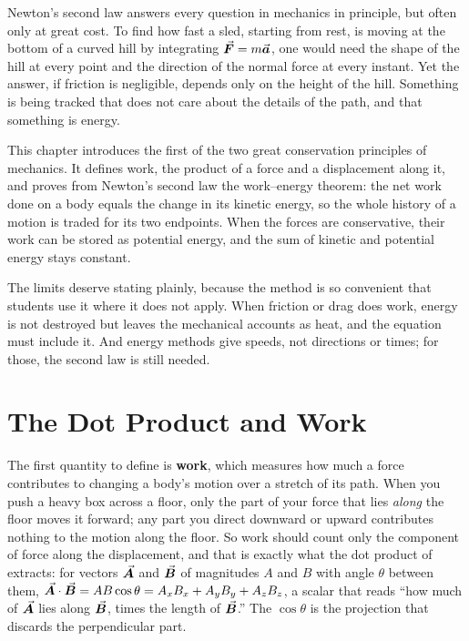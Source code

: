 

Newton's second law answers every question in mechanics in principle, but often only at great cost. To
find how fast a sled, starting from rest, is moving at the bottom of a curved hill by integrating $\vec{\bm{F}}=m\vec{\bm{a}}$, one would need the
shape of the hill at every point and the direction of the normal force at every instant. Yet the answer, if
friction is negligible, depends only on the height of the hill. Something is being tracked that does not
care about the details of the path, and that something is energy.

This chapter introduces the first of the two great conservation principles of mechanics. It defines
work, the product of a force and a displacement along it, and proves from Newton's second law the
work--energy theorem: the net work done on a body equals the change in its kinetic energy, so the whole
history of a motion is traded for its two endpoints. When the forces are conservative, their work can be
stored as potential energy, and the sum of kinetic and potential energy stays constant.

The limits deserve stating plainly, because the method is so convenient that students use it where it
does not apply. When friction or drag does work, energy is not destroyed but leaves the mechanical
accounts as heat, and the equation must include it. And energy methods give speeds, not directions or
times; for those, the second law is still needed.

\section{The Dot Product and Work}

The first quantity to define is \textbf{work}, which measures how much a force contributes to changing a
body's motion over a stretch of its path. When you push a heavy box across a floor, only the part of your
force that lies \emph{along} the floor moves it forward; any part you direct downward or upward
contributes nothing to the motion along the floor. So work should count only the component of force along
the displacement, and that is exactly what the dot product of  extracts: for vectors
$\vec{\bm{A}}$ and $\vec{\bm{B}}$ of magnitudes $A$ and $B$ with angle $\theta$ between them,
$\vec{\bm{A}}\cdot\vec{\bm{B}}=AB\cos\theta=A_xB_x+A_yB_y+A_zB_z$, a scalar that reads ``how much of $\vec{\bm{A}}$ lies along $\vec{\bm{B}}$,
times the length of $\vec{\bm{B}}$.'' The $\cos\theta$ is the projection that discards the perpendicular part.

